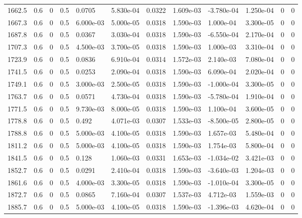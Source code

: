 \documentclass[preview]{standalone}
\begin{document}
{{{{{\begin{tabular}{L{1.2cm}C{1.2cm} C{0.3cm}C{0.5cm} C{1.4cm}C{1.4cm} C{1.4cm}C{1.4cm} C{1.6cm}C{1.6cm} C{1.6cm}C{1.6cm}}
  1662.5  &   0.6  & 0     & 0.5 &  0.0705  & 5.830e-04  &  0.0322&   1.609e-03& -3.780e-04 & 1.250e-04   &  0 & 0  \\ 
  1667.3  &   0.6  & 0     & 0.5 &  6.000e-03  & 5.000e-05  &  0.0318&   1.590e-03& 1.000e-04 & 3.300e-05   &  0 & 0  \\ 
  1687.8  &   0.6  & 0     & 0.5 &  0.0367  & 3.030e-04  &  0.0318&   1.590e-03& -6.550e-04 & 2.170e-04   &  0 & 0  \\ 
  1707.3  &   0.6  & 0     & 0.5 &  4.500e-03  & 3.700e-05  &  0.0318&   1.590e-03& 1.000e-03 & 3.310e-04   &  0 & 0  \\ 
  1723.9  &   0.6  & 0     & 0.5 &  0.0836  & 6.910e-04  &  0.0314&   1.572e-03& 2.140e-03 & 7.080e-04   &  0 & 0  \\ 
  1741.5  &   0.6  & 0     & 0.5 &  0.0253  & 2.090e-04  &  0.0318&   1.590e-03& 6.090e-04 & 2.020e-04   &  0 & 0  \\ 
  1749.1  &   0.6  & 0     & 0.5 &  3.000e-03  & 2.500e-05  &  0.0318&   1.590e-03& -1.000e-04 & 3.300e-05   &  0 & 0  \\ 
  1763.7  &   0.6  & 0     & 0.5 &  0.0571  & 4.730e-04  &  0.0318&   1.590e-03& -5.780e-04 & 1.910e-04   &  0 & 0  \\ 
  1771.5  &   0.6  & 0     & 0.5 &  9.730e-03  & 8.000e-05  &  0.0318&   1.590e-03& 1.100e-04 & 3.600e-05   &  0 & 0  \\ 
  1778.8  &   0.6  & 0     & 0.5 &  0.492  & 4.071e-03  &  0.0307&   1.533e-03& -8.500e-05 & 2.800e-05   &  0 & 0  \\ 
  1788.8  &   0.6  & 0     & 0.5 &  5.000e-03  & 4.100e-05  &  0.0318&   1.590e-03& 1.657e-03 & 5.480e-04   &  0 & 0  \\ 
  1811.2  &   0.6  & 0     & 0.5 &  5.000e-03  & 4.100e-05  &  0.0318&   1.590e-03& 1.754e-03 & 5.800e-04   &  0 & 0  \\ 
  1841.5  &   0.6  & 0     & 0.5 &  0.128  & 1.060e-03  &  0.0331&   1.653e-03& -1.034e-02 & 3.421e-03   &  0 & 0  \\ 
  1852.7  &   0.6  & 0     & 0.5 &  0.0291  & 2.410e-04  &  0.0318&   1.590e-03& -3.640e-03 & 1.204e-03   &  0 & 0  \\ 
  1861.6  &   0.6  & 0     & 0.5 &  4.000e-03  & 3.300e-05  &  0.0318&   1.590e-03& -1.010e-04 & 3.300e-05   &  0 & 0  \\ 
  1872.7  &   0.6  & 0     & 0.5 &  0.0865  & 7.160e-04  &  0.0307&   1.537e-03& 4.712e-03 & 1.559e-03   &  0 & 0  \\ 
  1885.7  &   0.6  & 0     & 0.5 &  5.000e-03  & 4.100e-05  &  0.0318&   1.590e-03& -1.396e-03 & 4.620e-04   &  0 & 0  \\ 

\end{tabular}}}}}}
\end{document}

